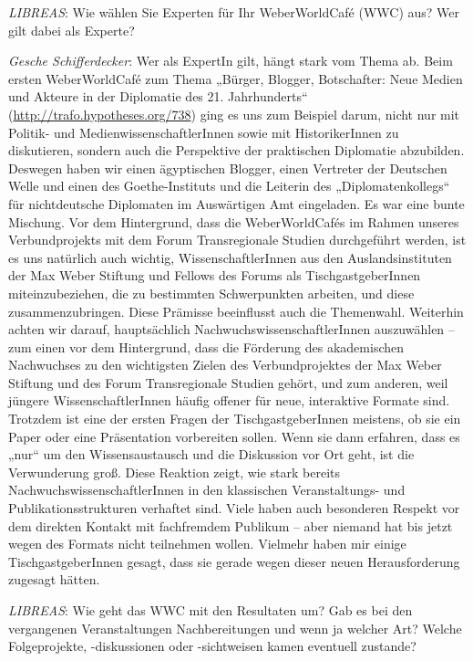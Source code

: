\documentclass[a4paper,
fontsize=11pt,
oneside,
numbers=noperiodatend,
parskip=half-,
bibliography=totoc,
final
]{scrartcl}
\begin{document}
\emph{LIBREAS}: Wie wählen Sie Experten für Ihr WeberWorldCafé (WWC)
aus? Wer gilt dabei als Experte?

\emph{Gesche Schifferdecker}: Wer als ExpertIn gilt, hängt stark vom
Thema ab. Beim ersten WeberWorldCafé zum Thema „Bürger, Blogger,
Botschafter: Neue Medien und Akteure in der Diplomatie des 21.
Jahrhunderts`` (\url{http://trafo.hypotheses.org/738}) ging es uns zum
Beispiel darum, nicht nur mit Politik- und MedienwissenschaftlerInnen
sowie mit HistorikerInnen zu diskutieren, sondern auch die Perspektive
der praktischen Diplomatie abzubilden. Deswegen haben wir einen
ägyptischen Blogger, einen Vertreter der Deutschen Welle und einen des
Goethe-Instituts und die Leiterin des „Diplomatenkollegs`` für
nichtdeutsche Diplomaten im Auswärtigen Amt eingeladen. Es war eine
bunte Mischung. Vor dem Hintergrund, dass die WeberWorldCafés im Rahmen
unseres Verbundprojekts mit dem Forum Transregionale Studien
durchgeführt werden, ist es uns natürlich auch wichtig,
WissenschaftlerInnen aus den Auslandsinstituten der Max Weber Stiftung
und Fellows des Forums als TischgastgeberInnen miteinzubeziehen, die zu
bestimmten Schwerpunkten arbeiten, und diese zusammenzubringen. Diese
Prämisse beeinflusst auch die Themenwahl. Weiterhin achten wir darauf,
hauptsächlich NachwuchswissenschaftlerInnen auszuwählen -- zum einen vor
dem Hintergrund, dass die Förderung des akademischen Nachwuchses zu den
wichtigsten Zielen des Verbundprojektes der Max Weber Stiftung und des
Forum Transregionale Studien gehört, und zum anderen, weil jüngere
WissenschaftlerInnen häufig offener für neue, interaktive Formate sind.
Trotzdem ist eine der ersten Fragen der TischgastgeberInnen meistens, ob
sie ein Paper oder eine Präsentation vorbereiten sollen. Wenn sie dann
erfahren, dass es „nur`` um den Wissensaustausch und die Diskussion vor
Ort geht, ist die Verwunderung groß. Diese Reaktion zeigt, wie stark
bereits NachwuchswissenschaftlerInnen in den klassischen Veranstaltungs-
und Publikationsstrukturen verhaftet sind. Viele haben auch besonderen
Respekt vor dem direkten Kontakt mit fachfremdem Publikum -- aber
niemand hat bis jetzt wegen des Formats nicht teilnehmen wollen.
Vielmehr haben mir einige TischgastgeberInnen gesagt, dass sie gerade
wegen dieser neuen Herausforderung zugesagt hätten.

\emph{LIBREAS}: Wie geht das WWC mit den Resultaten um? Gab es bei den
vergangenen Veranstaltungen Nachbereitungen und wenn ja welcher Art?
Welche Folgeprojekte, -diskussionen oder -sichtweisen kamen eventuell
zustande?
\end{document}
